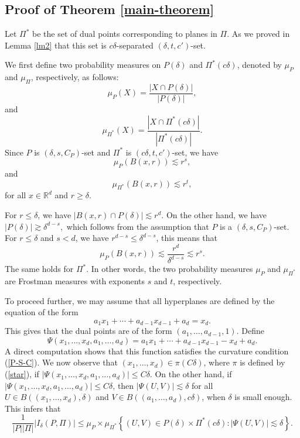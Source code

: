 \documentclass[11pt]{article}
\newcommand{\1}{\mathbf{1}}
\begin{document}
\subsection{Proof of Theorem \ref{main-theorem}}
Let $\Pi^*$ be the set of dual points corresponding to planes in $\Pi$. As we proved in Lemma \ref{lm2} that this set is $c\delta$-separated $(\delta, t, c')$-set. 

We first define two probability measures on $P(\delta)$ and $\Pi^*(c\delta)$, denoted by $\mu_P$ and $\mu_{\Pi}$, respectively, as follows:
\[\mu_P(X)=\frac{ | X\cap P(\delta)|}{|P(\delta)|},\]
and 
\[\mu_{\Pi^*}(X)=\frac{|X\cap \Pi^*(c\delta)|}{|\Pi^*(c\delta)|}.\]
Since $P$ is $(\delta, s, C_P)$-set and $\Pi^*$ is $(c\delta, t, c')$-set, we have
\[\mu_P(B(x, r)) \lesssim r^s,\]
and 
\[\mu_{\Pi^*}(B(x, r))\lesssim r^{t},\]
for all $x\in \mathbb{R}^d$ and $r\ge \delta$. 

For $r\le \delta$, we have $|B(x, r)\cap P(\delta)|\lesssim r^d$. On the other hand, we have $ |P(\delta)|\gtrsim \delta^{d-s},$
which follows from the assumption that $P$ is a $(\delta, s, C_P)$-set. For $r\le \delta$ and $s<d$, we have $r^{d-s}\le \delta^{d-s}$, this means that 
\[\mu_P(B(x, r))\lesssim \frac{r^d}{\delta^{d-s}}\lesssim r^s.\]
The same holds for $\Pi^*$. In other words, the two probability measures $\mu_{P}$ and $\mu_{\Pi^*}$ are Frostman measures with exponents $s$ and $t$, respectively. 

To proceed further, we may assume that all hyperplanes are defined by the equation of the form 
\begin{equation}\label{star}a_1x_1+\cdots +a_{d-1}x_{d-1}+a_d=x_d.\end{equation}
This gives that the dual points are of the form $(a_1, \ldots, a_{d-1}, 1)$.
Define 
\[\Psi(x_1, \ldots, x_d, a_1, \ldots, a_d)=a_1x_1+\cdots+a_{d-1}x_{d-1}-x_d+a_d.\]
A direct computation shows that this function satisfies the curvature condition (\ref{P-S-C}). 
We now observe that $(x_1, \ldots, x_d)\in \pi(C\delta)$, where $\pi$ is defined by (\ref{star}), if $|\Psi(x_1, \ldots, x_d, a_1, \ldots, a_d)|\le C\delta$. On the other hand, if $|\Psi(x_1, \ldots, x_d, a_1, \ldots, a_d)|\le C\delta$, then $|\Psi(U,V)|\lesssim \delta$ for all $U\in B((x_1, \ldots, x_d), \delta)$ and $V\in B((a_1, \ldots, a_d), c\delta)$, when $\delta$ is small enough. This infers that
\[\frac{1}{|P||\Pi|}|I_{\delta}(P, \Pi)|\le \mu_P\times \mu_{\Pi^*}\left\lbrace (U, V)\in P(\delta)\times \Pi^*(c\delta) \colon |\Psi(U, V)|\lesssim \delta \right\rbrace.\]
\end{document}
